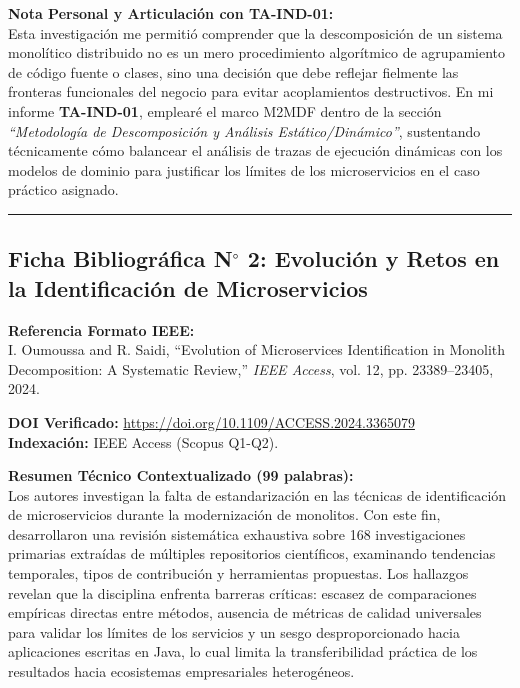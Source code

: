 \documentclass[11pt,a4paper]{article}
\begin{document}
\vspace{2mm}
\noindent\textbf{Nota Personal y Articulación con TA-IND-01:}\\
Esta investigación me permitió comprender que la descomposición de un sistema monolítico distribuido no es un mero procedimiento algorítmico de agrupamiento de código fuente o clases, sino una decisión que debe reflejar fielmente las fronteras funcionales del negocio para evitar acoplamientos destructivos. En mi informe \textbf{TA-IND-01}, emplearé el marco M2MDF dentro de la sección \textit{``Metodología de Descomposición y Análisis Estático/Dinámico''}, sustentando técnicamente cómo balancear el análisis de trazas de ejecución dinámicas con los modelos de dominio para justificar los límites de los microservicios en el caso práctico asignado.

\vspace{4mm}
\hrule
\vspace{5mm}

\subsection*{Ficha Bibliográfica N$^\circ$ 2: Evolución y Retos en la Identificación de Microservicios}

\noindent\textbf{Referencia Formato IEEE:}\\
\nocite{Oumoussa2024}\cite{Oumoussa2024} I. Oumoussa and R. Saidi, ``Evolution of Microservices Identification in Monolith Decomposition: A Systematic Review,'' \textit{IEEE Access}, vol. 12, pp. 23389--23405, 2024.

\vspace{1.5mm}
\noindent\textbf{DOI Verificado:} \url{https://doi.org/10.1109/ACCESS.2024.3365079}\\
\textbf{Indexación:} IEEE Access (Scopus Q1-Q2).

\vspace{2mm}
\noindent\textbf{Resumen Técnico Contextualizado (99 palabras):}\\
Los autores investigan la falta de estandarización en las técnicas de identificación de microservicios durante la modernización de monolitos. Con este fin, desarrollaron una revisión sistemática exhaustiva sobre 168 investigaciones primarias extraídas de múltiples repositorios científicos, examinando tendencias temporales, tipos de contribución y herramientas propuestas. Los hallazgos revelan que la disciplina enfrenta barreras críticas: escasez de comparaciones empíricas directas entre métodos, ausencia de métricas de calidad universales para validar los límites de los servicios y un sesgo desproporcionado hacia aplicaciones escritas en Java, lo cual limita la transferibilidad práctica de los resultados hacia ecosistemas empresariales heterogéneos.
\end{document}
